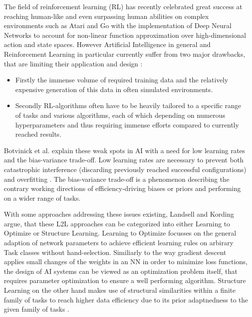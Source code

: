 \documentclass[letterpaper, 10 pt, conference]{ieeeconf}  %
\begin{document}
The field of reinforcement learning (RL) has recently celebrated great success at reaching human-like and even surpassing human abilities on
complex environments such as Atari \cite{mnihAsynchronousMethodsDeep2016} and Go \cite{silverMasteringGameGo2016} with the implementation 
of Deep Neural Networks to 
account for non-linear function approximation over high-dimensional action and state spaces. However Artificial Intelligence in general 
\cite{lansdellLearningtolearn2018} and Reinforcement Learning in particular \cite{duanRLFastReinforcement2016} currently
suffer from two major drawbacks, 
that are limiting their application and design \cite{wangLearningReinforcementLearn2016}:
\begin{itemize}
        \item Firstly the immense volume of required training data and the relatively expensive generation of this data in often simulated
        environments.
        \item Secondly RL-algorithms often have to be heavily tailored to a specific range of tasks and various algorithms, each of which
        depending on numerous hyperparameters and thus requiring immense efforts compared to currently reached results.
\end{itemize}        

Botvinick et al. \cite{botvinickReinforcementLearningFast2019} explain these weak spots in AI with a need for low 
learning rates and the bias-variance trade-off.
Low learning rates are necessary to prevent both catastrophic interference (discarding previously reached successful
configurations) and overfitting \cite{hardtTrainFasterGeneralize2015}. The bias-variance trade-off is a phenomenon describing the contrary 
working directions of efficiency-driving biases or priors and performing on a wider range of tasks. \newline

With some approaches addressing these issues existing, Landsell and Kording\cite{lansdellLearningtolearn2018} argue, 
that these L2L approaches can be categorized into 
either Learning to Optimize or Structure Learning. Learning to Optimize focusses on the general 
adaption of network parameters to achieve efficient learning rules on arbirary Task classes without hand-selection. Similiarly to the way
gradient descent applies small changes of the weights in an NN in order to minimize loss functions, the design of AI systems can be viewed as
an optimization problem itself, that requires parameter optimization to ensure a well performing algorithm. Structure Learning 
on the other hand makes use of structural similarities within a finite family of tasks to reach higher data
efficiency due to its prior adaptnedness to the given family of tasks \cite{lansdellLearningtolearn2018}. \newline
\end{document}
